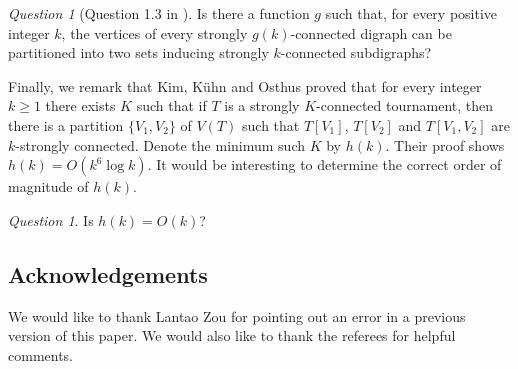 \documentclass[english]{article}
\theoremstyle{plain}
\theoremstyle{remark}
\newtheorem{question}[theorem]{Question}
\begin{document}
	\begin{question} [Question 1.3 in \cite{kuhn2016proof}]
		Is there a function $g$ such that, for every positive integer $k$, the vertices of every strongly $g(k)$-connected digraph can be partitioned into two sets inducing strongly $k$-connected subdigraphs?
	\end{question}

	Finally, we remark that Kim, K\"uhn and Osthus \cite{kim2016bipartitions} proved that for every integer $k \ge 1$ there exists $K$ such that if $T$ is a strongly $K$-connected tournament, then there is a partition $\{V_1, V_2\}$ of $V(T)$ such that $T[V_1]$, $T[V_2]$ and $T[V_1, V_2]$ are $k$-strongly connected. Denote the minimum such $K$ by $h(k)$. Their proof shows $h(k) = O(k^6 \log k)$. It would be interesting to determine the correct order of magnitude of $h(k)$.
	
	\begin{question}
		Is $h(k) = O(k)$?
	\end{question}

\subsection*{Acknowledgements}

	We would like to thank Lantao Zou for pointing out an error in a previous version of this paper. We would also like to thank the referees for helpful comments.

	
	
\end{document}
